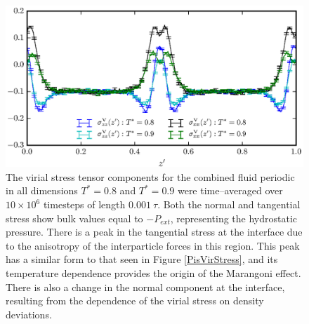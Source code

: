 \begin{figure}[h!]
\centering
\includegraphics[scale=1.0]{Period10VirStress}
\caption{The virial stress tensor components for the combined fluid periodic in all dimensions $T^{*} = 0.8$ and $T^{*} = 0.9$ were time--averaged over $10 \times 10^{6}$ timesteps of length $0.001\ \tau$.
Both the normal and tangential stress show bulk values equal to $-P_{ext}$, representing the hydrostatic pressure.
There is a peak in the tangential stress at the interface due to the anisotropy of the interparticle forces in this region.
This peak has a similar form to that seen in Figure \ref{PisVirStress}, and its temperature dependence provides the origin of the Marangoni effect.
There is also a change in the normal component at the interface, resulting from the dependence of the virial stress on density deviations.
}
\label{Period10VirStress}
\end{figure}

